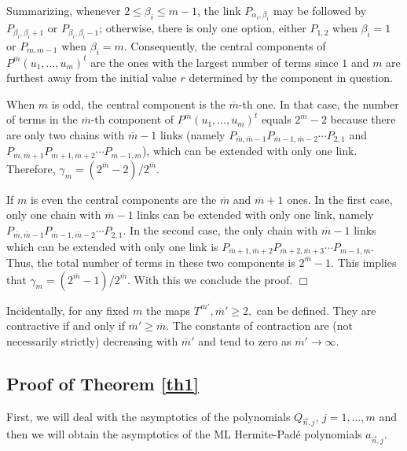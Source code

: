 \documentclass{amsart}
\numberwithin{equation}{section}
\theoremstyle{definition}
\newcommand{\n}{\vec{n}}          %
\begin{document}
Summarizing, whenever $2 \leq \beta_i \leq  {m}-1$, the link $P_{\alpha_i,\beta_i}$ may be followed by $P_{\beta_i,\beta_i +1}$ or $P_{\beta_i,\beta_i -1}$; otherwise, there is only one option, either $P_{1,2}$ when $\beta_i = 1$ or $P_{m,m-1}$ when $\beta_i = m$. Consequently, the central components of  $P^{\overline{m}}(u_1,\ldots,u_m)^t $ are the ones with the largest number of terms since $1$ and $m$ are furthest away from the initial value $r$ determined by the component in question.

When $m$ is odd, the central component is the ${\overline{m}}$-th one. In that case, the number of terms in the ${\overline{m}}$-th component of  $P^{\overline{m}}(u_1,\ldots,u_m)^t $ equals $2^{\overline{m}} -2$ because  there are only two chains with ${\overline{m}}-1$ links  (namely $P_{{\overline{m}},{\overline{m}}-1}P_{{\overline{m}}-1,{\overline{m}}-2}\cdots P_{2,1}$ and $P_{{\overline{m}},{\overline{m}}+1}P_{{\overline{m}}+1,{\overline{m}}+2}\cdots P_{m-1,m}$), which can be 
extended with only one link. Therefore, $\gamma_m = (2^{\overline{m}} -2)/2^{\overline{m}}$.

If $m$ is even the central components are the ${\overline{m}}$ and ${\overline{m}}+1$ ones. In the first case,   only one chain with ${\overline{m}}-1$ links can be extended with only one link, namely $P_{{\overline{m}},{\overline{m}}-1}P_{{\overline{m}}-1,{\overline{m}}-2}\cdots P_{2,1}$. In the second case, the only chain  with ${\overline{m}}-1$ links which can be extended with only one link is $P_{{\overline{m}}+1,{\overline{m}}+2}P_{{\overline{m}}+2,{\overline{m}}+3}\cdots P_{m-1,m}$. Thus, the total number of terms in these two components is $2^{\overline{m}} -1$. This implies that $\gamma_m = (2^{\overline{m}} -1)/2^{\overline{m}}$. With this we conclude the proof.
 \hfill $\Box$


 Incidentally, for any fixed $m$ the maps $T^{{\overline{m}}'}, {\overline{m}}' \geq 2,$ can be defined. They are contractive if and only if ${\overline{m}}' \geq {\overline{m}}$. The constants of contraction are (not necessarily strictly) decreasing  with ${\overline{m}}'$ and tend to zero as ${\overline{m}}' \to \infty$.

 \subsection{Proof of Theorem \ref{th1}}

 First, we will deal with the asymptotics of the polynomials $Q_{\n,j}$, $j=1,\ldots,m$ and then we will obtain the asymptotics of the ML Hermite-Padé polynomials $a_{\n,j}$.
\end{document}
